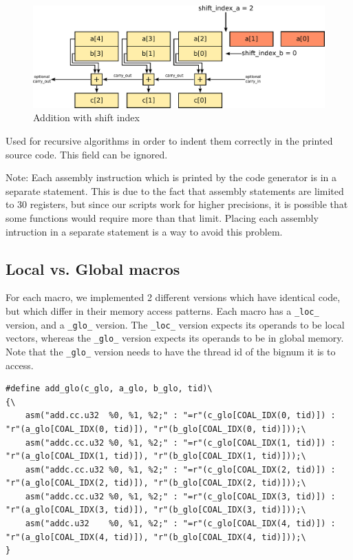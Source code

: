 \documentclass[12pt, a4paper]{report}
\begin{document}
\begin{sloppypar}
\begin{description}
\begin{figure}[h]
\centering
\includegraphics[width=\linewidth]{figs/addition_with_shift_index}
\caption{Addition with shift index}
\label{fig:addition_with_shift_index}
\end{figure}

\item[\Q{indent}] Used for recursive algorithms in order to indent them
correctly in the printed source code.
This field can be ignored.
\end{description}

Note: Each assembly instruction which is printed by the code generator is in a
separate statement.
This is due to the fact that assembly statements are limited to 30 registers,
but since our scripts work for higher precisions, it is possible that some
functions would require more than that limit.
Placing each assembly intruction in a separate statement is a way to avoid this
problem.

\subsection{Local vs. Global macros}
For each macro, we implemented 2 different versions which have identical code,
but which differ in their memory access patterns.
Each macro has a \verb+_loc_+ version, and a \verb+_glo_+ version.
The \verb+_loc_+ version expects its operands to be local vectors, whereas
the \verb+_glo_+ version expects its operands to be in global memory.
Note that the \verb+_glo_+ version needs to have the thread id of the bignum it
is to access.

\clearpage

\begin{lstlisting}
#define add_glo(c_glo, a_glo, b_glo, tid)\
{\
    asm("add.cc.u32  %0, %1, %2;" : "=r"(c_glo[COAL_IDX(0, tid)]) : "r"(a_glo[COAL_IDX(0, tid)]), "r"(b_glo[COAL_IDX(0, tid)]));\
    asm("addc.cc.u32 %0, %1, %2;" : "=r"(c_glo[COAL_IDX(1, tid)]) : "r"(a_glo[COAL_IDX(1, tid)]), "r"(b_glo[COAL_IDX(1, tid)]));\
    asm("addc.cc.u32 %0, %1, %2;" : "=r"(c_glo[COAL_IDX(2, tid)]) : "r"(a_glo[COAL_IDX(2, tid)]), "r"(b_glo[COAL_IDX(2, tid)]));\
    asm("addc.cc.u32 %0, %1, %2;" : "=r"(c_glo[COAL_IDX(3, tid)]) : "r"(a_glo[COAL_IDX(3, tid)]), "r"(b_glo[COAL_IDX(3, tid)]));\
    asm("addc.u32    %0, %1, %2;" : "=r"(c_glo[COAL_IDX(4, tid)]) : "r"(a_glo[COAL_IDX(4, tid)]), "r"(b_glo[COAL_IDX(4, tid)]));\
}
\end{lstlisting}


\end{sloppypar}
\end{document}
